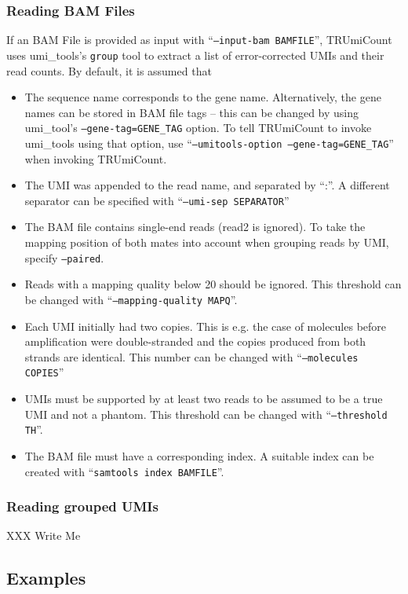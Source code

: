 \documentclass[10pt]{article}
\begin{document}
\subsubsection*{Reading BAM Files}

If an BAM File is provided as input with ``\texttt{--input-bam BAMFILE}'', TRUmiCount uses umi\_tools's \texttt{group} tool to extract a list of error-corrected UMIs and their read counts. By default, it is assumed that
\begin{itemize}
  \item The sequence name corresponds to the gene name. Alternatively, the gene names can be stored in BAM file tags -- this can be changed by using umi\_tool's \texttt{--gene-tag=GENE\_TAG} option. To tell TRUmiCount to invoke umi\_tools using that option, use ``\texttt{--umitools-option --gene-tag=\allowbreak GENE\_TAG}'' when invoking TRUmiCount.
  \item The UMI was appended to the read name, and separated by ``:''. A different separator can be specified with ``\texttt{--umi-sep SEPARATOR}''
  \item The BAM file contains single-end reads (read2 is ignored). To take the mapping position of both mates into account when grouping reads by UMI, specify \texttt{--paired}.
  \item Reads with a mapping quality below 20 should be ignored. This threshold can be changed with ``\texttt{--mapping-quality MAPQ}''.
  \item Each UMI initially had two copies. This is e.g. the case of molecules before amplification were double-stranded and the copies produced from both strands are identical. This number can be changed with ``\texttt{--molecules COPIES}''
  \item UMIs must be supported by at least two reads to be assumed to be a true UMI and not a phantom. This threshold can be changed with ``\texttt{--threshold TH}''.
  \item The BAM file must have a corresponding index. A suitable index can be created with ``\texttt{samtools index BAMFILE}''.
\end{itemize}

\subsubsection*{Reading grouped UMIs}

XXX Write Me

\subsection{Examples}
\end{document}
